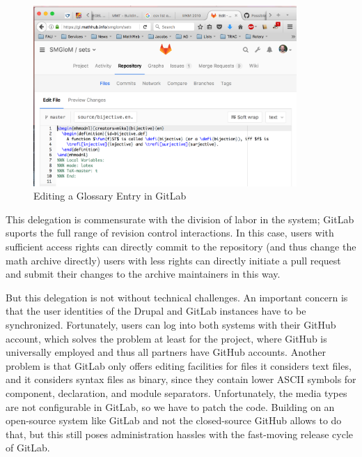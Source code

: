 \begin{figure}[ht]\centering
  \includegraphics[width=10cm]{bijective-edit}
  \caption{Editing a Glossary Entry in GitLab}\label{fig:bijective-edit}
\end{figure}

This delegation is commensurate with the division of labor in the \sys system; GitLab
suports the full range of revision control interactions. In this case, users with
sufficient access rights can directly commit to the repository (and thus change the math
archive directly) users with less rights can directly initiate a pull request and submit
their changes to the archive maintainers in this way. 

But this delegation is not without technical challenges. An important concern is that the
user identities of the Drupal and GitLab instances have to be synchronized. Fortunately,
users can log into both systems with their GitHub account, which solves the problem at
least for the \pn project, where GitHub is universally employed and thus all partners
have GitHub accounts. Another problem is that GitLab only offers editing facilities for
files it considers text files, and it considers \mmt syntax files as binary, since they
contain lower ASCII symbols for component, declaration, and module separators.
Unfortunately, the media types are not configurable in GitLab, so we have to patch the
code. Building on an open-source system like GitLab and not the closed-source GitHub
allows to do that, but this still poses administration hassles with the fast-moving
release cycle of GitLab.


